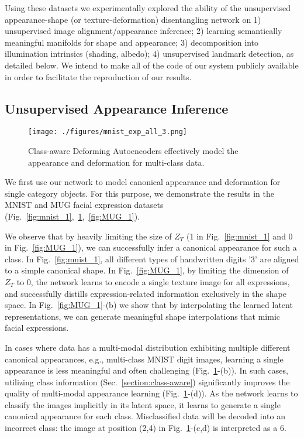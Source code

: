 \documentclass[runningheads]{llncs}
\begin{document}
Using these datasets we  experimentally explored the ability of the unsupervised appearance-shape (or texture-deformation) disentangling network on 1) unsupervised image alignment/appearance inference; 2) learning semantically meaningful manifolds for shape and appearance; 3) decomposition into illumination intrinsics (shading, albedo); 4) unsupervised landmark detection, as detailed below. We intend to make all of the code of our system publicly available in order to facilitate the reproduction of our results. 

\subsection{Unsupervised Appearance Inference}

\begin{figure}
    \centering
    \texttt{[image: ./figures/mnist\_exp\_all\_3.png]}
    \caption{Class-aware Deforming Autoencoders effectively model the appearance and deformation for multi-class data.}
    \label{fig:mnist_all}
\end{figure}

We first use our network to model canonical appearance and deformation for single category objects. For this purpose, we demonstrate the results in the MNIST and MUG facial expression datasets (Fig.~\ref{fig:mnist_1},~\ref{fig:mnist_all},~\ref{fig:MUG_1}).

We observe that by heavily limiting the size of $Z_T$ (1 in Fig.~\ref{fig:mnist_1} and 0 in Fig.~\ref{fig:MUG_1}), we can successfully infer a canonical appearance for such a class. In Fig.~\ref{fig:mnist_1}, all different types of handwritten digits '3' are aligned to a simple canonical shape. In Fig.~\ref{fig:MUG_1}, by limiting the dimension of $Z_T$ to $0$, the network learns to encode a single texture image for all expressions, and successfully distills expression-related information exclusively in the  shape space. In Fig.~\ref{fig:MUG_1}-(b) we show that by interpolating the learned latent representations, we can generate meaningful shape interpolations that mimic facial expressions.  

In cases where data has a multi-modal distribution exhibiting multiple different canonical appearances, e.g., multi-class MNIST digit images, learning a single appearance is less meaningful and often challenging (Fig.~\ref{fig:mnist_all}-(b)). In such cases, utilizing class information (Sec.~\ref{section:class-aware}) significantly improves the quality of multi-modal appearance learning (Fig.~\ref{fig:mnist_all}-(d)). As the network learns to classify the images implicitly in its latent space, it learns to generate a single canonical appearance for each class. Misclassified data will be decoded into an incorrect class: the image at position (2,4) in Fig.~\ref{fig:mnist_all}-(c,d) is interpreted as a 6.
\end{document}
